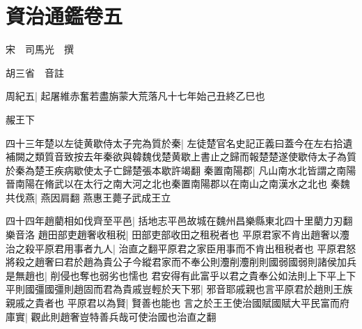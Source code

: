 \chapter{資治通鑑卷五}
宋　司馬光　撰

胡三省　音註

周紀五|{
	起屠維赤奮若盡旃蒙大荒落凡十七年始己丑終乙巳也}


赧王下

四十三年楚以左徒黄歇侍太子完為質於秦|{
	左徒楚官名史記正義曰蓋今在左右拾遺補闕之類質音致按去年秦欲與韓魏伐楚黄歇上書止之歸而報楚楚遂使歇侍太子為質於秦為楚王疾病歇使太子亡歸楚張本歇許竭翻}
秦置南陽郡|{
	凡山南水北皆謂之南陽晉南陽在脩武以在太行之南大河之北也秦置南陽郡以在南山之南漢水之北也}
秦魏共伐燕|{
	燕因肩翻}
燕惠王薨子武成王立

四十四年趙藺相如伐齊至平邑|{
	括地志平邑故城在魏州昌樂縣東北四十里藺力刃翻樂音洛}
趙田部吏趙奢收租税|{
	田部吏部收田之租税者也}
平原君家不肯出趙奢以灋治之殺平原君用事者九人|{
	治直之翻平原君之家臣用事而不肯出租税者也}
平原君怒將殺之趙奢曰君於趙為貴公子今縱君家而不奉公則灋削灋削則國弱國弱則諸侯加兵是無趙也|{
	削侵也奪也弱劣也懦也}
君安得有此富乎以君之貴奉公如法則上下平上下平則國彊國彊則趙固而君為貴戚豈輕於天下邪|{
	邪音耶戚親也言平原君於趙則王族親戚之貴者也}
平原君以為賢|{
	賢善也能也}
言之於王王使治國賦國賦大平民富而府庫實|{
	觀此則趙奢豈特善兵哉可使治國也治直之翻}


